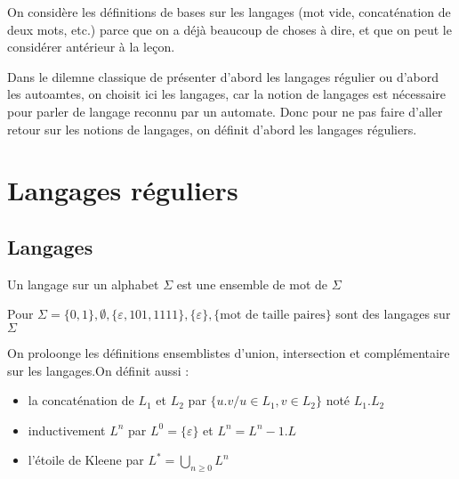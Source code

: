 
\begin{com}
	On considère les définitions de bases sur les langages (mot vide, concaténation de deux mots, etc.) parce que on a déjà beaucoup de choses à dire, et que on peut le considérer antérieur à la leçon.
\end{com}

\begin{com}
	Dans le dilemne classique de présenter d'abord les langages régulier ou d'abord les autoamtes, on choisit ici les langages, car la notion de langages est nécessaire pour parler de langage reconnu par un automate. Donc pour ne pas faire d'aller retour sur les notions de langages, on définit d'abord les langages réguliers.
\end{com}

\section{Langages réguliers}

\subsection{Langages}

\begin{definition}
	Un langage sur un alphabet $\Sigma$ est une ensemble de mot de $\Sigma$
\end{definition}

\begin{example}
	Pour $\Sigma = \{0,1\}, \emptyset, \{\varepsilon, 101, 1111\}, \{\varepsilon\}, \{\text{mot de taille paires}\}$ sont des langages sur $\Sigma$
\end{example}

\begin{definition}
	On proloonge les définitions ensemblistes d'union, intersection et complémentaire sur les langages.On définit aussi : \begin{itemize}[label=$\star$]
		\item la concaténation de $L_1$ et $L_2$ par $\{u.v / u \in L_1, v \in L_2\}$ noté $L_1.L_2$
		\item inductivement $L^n$ par $L^0 = \{\varepsilon\}$ et $L^n = L^n-1 . L$
		\item l'étoile de Kleene par $L^* = \bigcup\limits_{n \geq 0} L^n$
	\end{itemize}
\end{definition}

